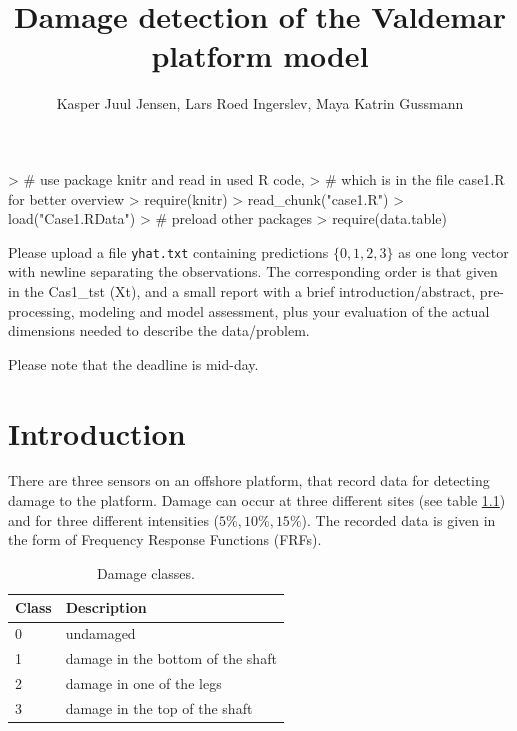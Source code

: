 \documentclass[a4paper,draft=false]{scrreprt}
\title{Damage detection of the Valdemar platform model}
\author{Kasper Juul Jensen, Lars Roed Ingerslev, Maya Katrin Gussmann}
\begin{document}

\maketitle

\begin{Schunk}
\begin{Sinput}
>   # use package knitr and read in used R code,
>   # which is in the file case1.R for better overview
>   require(knitr)
>   read_chunk("case1.R")
>   load("Case1.RData")
>   # preload other packages
>   require(data.table)
\end{Sinput}
\end{Schunk}

Please upload a file \verb+yhat.txt+ containing predictions $\lbrace 0, 1, 2, 3\rbrace$ as one long vector with newline separating the observations. The corresponding order is that given in the \mbox{Cas1\_tst} (Xt), and a small report with a brief introduction/abstract, pre-processing, modeling and model assessment, plus your evaluation of the actual dimensions needed to describe the data/problem.

Please note that the deadline is mid-day.

\chapter{Introduction}

There are three sensors on an offshore platform, that record data for detecting damage to the platform. Damage can occur at three different sites (see table \ref{table:damageclass}) and for three different intensities ($5\%, 10\%, 15\%$). The recorded data is given in the form of Frequency Response Functions (FRFs).

\begin{table}[ht]
\begin{center}
\begin{tabular}{ll}
  \hline
  Class & Description\\\hline
  0 & undamaged\\
  1 & damage in the bottom of the shaft\\
  2 & damage in one of the legs\\
  3 & damage in the top of the shaft\\
  \hline
\end{tabular}
\caption{Damage classes.\label{table:damageclass}}
\end{center}
\end{table}
\end{document}
